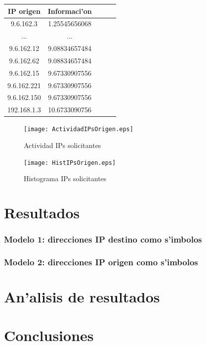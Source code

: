 \documentclass[a4paper,10pt]{article}
\begin{document}
\noindent \begin{tabular}{| c | c | c | c | r} \hline
IP origen	&	Informaci'on	\\	\hline
9.6.162.3	 & 	1.25545656068	 \\ \hline 
...	&	...	\\ \hline
9.6.162.12	 & 	9.08834657484	 \\ \hline 
9.6.162.62	 & 	9.08834657484	 \\ \hline 
9.6.162.15	 & 	9.67330907556	 \\ \hline 
9.6.162.221	 & 	9.67330907556	 \\ \hline 
9.6.162.150	 & 	9.67330907556	 \\ \hline 
192.168.1.3	 & 	10.6733090756	 \\ \hline 
\end{tabular}	

\newpage

\begin{figure}[!hbp]
\begin{center}
\texttt{[image: ActividadIPsOrigen.eps]}
\end{center}
\caption{Actividad IPs solicitantes} \label{figura4}
\end{figure}

\begin{figure}[!hbp]
\begin{center}
\texttt{[image: HistIPsOrigen.eps]}
\end{center}
\caption{Histograma IPs solicitantes} \label{figura5}
\end{figure}

\newpage

\clearpage

\section{Resultados}
\label{resultados1:}

\subsubsection{Modelo 1: direcciones IP destino como s'imbolos}

\subsubsection{Modelo 2: direcciones IP origen como s'imbolos}

\section{An'alisis de resultados}
\label{analisis1:}

\section{Conclusiones}
\label{conclusion1:}

\begin{thebibliography}{99}
\end{thebibliography}
\end{document}
